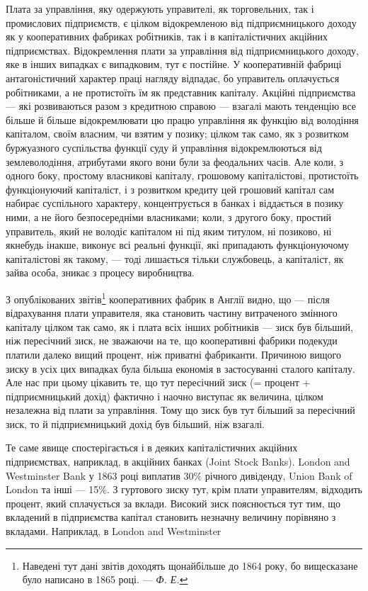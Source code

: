 Плата за управління, яку одержують управителі, як торговельних,
так і промислових підприємств, є цілком відокремленою від
підприємницького доходу як у кооперативних фабриках робітників,
так і в капіталістичних акційних підприємствах. Відокремлення
плати за управління від підприємницького доходу, яке в інших
випадках є випадковим, тут є постійне. У кооперативній фабриці
антагоністичний характер праці нагляду відпадає, бо управитель
оплачується робітниками, а не протистоїть їм як представник
капіталу. Акційні підприємства — які розвиваються разом
з кредитною справою — взагалі мають тенденцію все більше й
більше відокремлювати цю працю управління як функцію від
володіння капіталом, своїм власним, чи взятим у позику; цілком
так само, як з розвитком буржуазного суспільства функції суду
й управління відокремлюються від землеволодіння, атрибутами
якого вони були за феодальних часів. Але коли, з одного
боку, простому власникові капіталу, грошовому капіталістові,
протистоїть функціонуючий капіталіст, і з розвитком кредиту
цей грошовий капітал сам набирає суспільного характеру, концентрується
в банках і віддається в позику ними, а не його безпосередніми
власниками; коли, з другого боку, простий
управитель, який не володіє капіталом ні під яким титулом,
ні позиково, ні якнебудь інакше, виконує всі реальні функції,
які припадають функціонуючому капіталістові як такому, — тоді
лишається тільки службовець, а капіталіст, як зайва особа,
зникає з процесу виробництва.

З опублікованих звітів\footnote{
Наведені тут дані звітів доходять щонайбільше до 1864 року, бо вищесказане
було написано в 1865 році. — \emph{Ф. Е.}
} кооперативних фабрик в Англії видно,
що — після відрахування плати управителя, яка становить частину
витраченого змінного капіталу цілком так само, як і плата
всіх інших робітників — зиск був більший, ніж пересічний зиск,
не зважаючи на те, що кооперативні фабрики подекуди платили
далеко вищий процент, ніж приватні фабриканти. Причиною
вищого зиску в усіх цих випадках була більша економія
в застосуванні сталого капіталу. Але нас при цьому цікавить те,
що тут пересічний зиск (= процент + підприємницький дохід)
фактично і наочно виступає як величина, цілком незалежна від
плати за управління. Тому що зиск був тут більший за пересічний
зиск, то й підприємницький дохід був більший, ніж взагалі.

Те саме явище спостерігається і в деяких капіталістичних акційних
підприємствах, наприклад, в акційних банках (Joint Stock
Banks). London and Westminster Bank у 1863 році виплатив 30\%
річного дивіденду, Union Bank of London та інші — 15\%. З гуртового
зиску тут, крім плати управителям, відходить процент,
який сплачується за вклади. Високий зиск пояснюється тут тим,
що вкладений в підприємства капітал становить незначну величину
порівняно з вкладами. Наприклад, в London and Westminster
\parbreak{}  %
